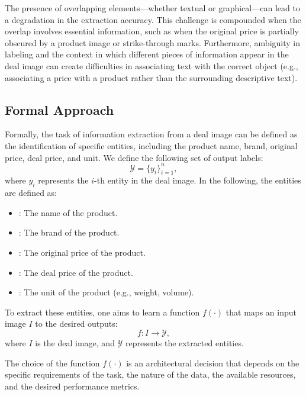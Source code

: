 \documentclass[11pt]{article}
\begin{document}
The presence of overlapping elements—whether textual or graphical—can lead to a degradation in the extraction accuracy. This challenge is compounded when the overlap involves essential information, such as when the original price is partially obscured by a product image or strike-through marks. Furthermore, ambiguity in labeling and the context in which different pieces of information appear in the deal image can create difficulties in associating text with the correct object (e.g., associating a price with a product rather than the surrounding descriptive text).

\subsection{Formal Approach}
Formally, the task of information extraction from a deal image can be defined as the identification of specific entities, including the product name, brand, original price, deal price, and unit. We define the following set of output labels:
\begin{equation}
\mathcal{Y} = \{y_{i}\}_{i=1}^{n},
\end{equation}
where \(y_{i}\) represents the $i$-th entity in the deal image. In the following, the entities are defined as:
\begin{itemize}
    \item {}: The name of the product.
    \item {}: The brand of the product.
    \item {}: The original price of the product.
    \item {}: The deal price of the product.
    \item {}: The unit of the product (e.g., weight, volume).
\end{itemize}

To extract these entities, one aims to learn a function \(f(\cdot)\) that maps an input image \(I\) to the desired outputs:
\begin{equation}
    f: I \to \mathcal{Y},
\end{equation}
where \( I \) is the deal image, and \( \mathcal{Y} \) represents the extracted entities.

The choice of the function \( f(\cdot) \) is an architectural decision that depends on the specific requirements of the task, the nature of the data, the available resources, and the desired performance metrics. 
\end{document}
